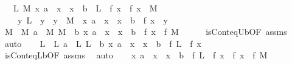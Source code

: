\begin{isabellebody}
\ \ \ {\isachardoublequoteopen}{\isasymexists}L\ M{\isachardot}{\kern0pt}\ {\isacharparenleft}{\kern0pt}{\isasymforall}x{\isachardot}{\kern0pt}\ a\ {\isasymle}\ x\ {\isasymand}\ x\ {\isasymle}\ b\ {\isasymlongrightarrow}\ L\ {\isasymle}\ f\ x\ {\isasymand}\ f\ x\ {\isasymle}\ M{\isacharparenright}{\kern0pt}\ {\isasymand}\isanewline
\ \ \ \ {\isacharparenleft}{\kern0pt}{\isasymforall}y{\isachardot}{\kern0pt}\ L\ {\isasymle}\ y\ {\isasymand}\ y\ {\isasymle}\ M\ {\isasymlongrightarrow}\ {\isacharparenleft}{\kern0pt}{\isasymexists}x{\isachardot}{\kern0pt}\ a\ {\isasymle}\ x\ {\isasymand}\ x\ {\isasymle}\ b\ {\isasymand}\ {\isacharparenleft}{\kern0pt}f\ x\ {\isacharequal}{\kern0pt}\ y{\isacharparenright}{\kern0pt}{\isacharparenright}{\kern0pt}{\isacharparenright}{\kern0pt}{\isachardoublequoteclose}\isanewline
%
\isadelimproof
%
\endisadelimproof
%
\isatagproof
{}\isamarkupfalse%
\ {\isacharminus}{\kern0pt}\isanewline
\ \ \isamarkupfalse%
\ M\ \ M{\isacharcolon}{\kern0pt}\ {\isachardoublequoteopen}a\ {\isasymle}\ M{\isachardoublequoteclose}\ {\isachardoublequoteopen}M\ {\isasymle}\ b{\isachardoublequoteclose}\ {\isachardoublequoteopen}{\isasymforall}x{\isachardot}{\kern0pt}\ a\ {\isasymle}\ x\ {\isasymand}\ x\ {\isasymle}\ b\ {\isasymlongrightarrow}\ f\ x\ {\isasymle}\ f\ M{\isachardoublequoteclose}\isanewline
\ \ \ \ \isamarkupfalse%
\ isCont{\isacharunderscore}{\kern0pt}eq{\isacharunderscore}{\kern0pt}Ub{\isacharbrackleft}{\kern0pt}OF\ assms{\isacharbrackright}{\kern0pt}\ \isamarkupfalse%
\ auto\isanewline
\ \ \isamarkupfalse%
\ L\ \ L{\isacharcolon}{\kern0pt}\ {\isachardoublequoteopen}a\ {\isasymle}\ L{\isachardoublequoteclose}\ {\isachardoublequoteopen}L\ {\isasymle}\ b{\isachardoublequoteclose}\ {\isachardoublequoteopen}{\isasymforall}x{\isachardot}{\kern0pt}\ a\ {\isasymle}\ x\ {\isasymand}\ x\ {\isasymle}\ b\ {\isasymlongrightarrow}\ f\ L\ {\isasymle}\ f\ x{\isachardoublequoteclose}\isanewline
\ \ \ \ \isamarkupfalse%
\ isCont{\isacharunderscore}{\kern0pt}eq{\isacharunderscore}{\kern0pt}Lb{\isacharbrackleft}{\kern0pt}OF\ assms{\isacharbrackright}{\kern0pt}\ \isamarkupfalse%
\ auto\isanewline
\ \ \isamarkupfalse%
\ {\isachardoublequoteopen}{\isacharparenleft}{\kern0pt}{\isasymforall}x{\isachardot}{\kern0pt}\ a\ {\isasymle}\ x\ {\isasymand}\ x\ {\isasymle}\ b\ {\isasymlongrightarrow}\ f\ L\ {\isasymle}\ f\ x\ {\isasymand}\ f\ x\ {\isasymle}\ f\ M{\isacharparenright}{\kern0pt}{\isachardoublequoteclose}\isanewline

\end{isabellebody}
